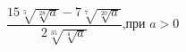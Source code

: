 \begin{ex}[type=calculate_expression]
	\begin{condition}
		\( \dfrac{15\sqrt[5]{\sqrt[28]{a}}-7\sqrt[7]{\sqrt[20]{a}}}{2\sqrt[35]{\sqrt[4]{a}}} \),\quad при \( a>0 \)
	\end{condition}
\end{ex}